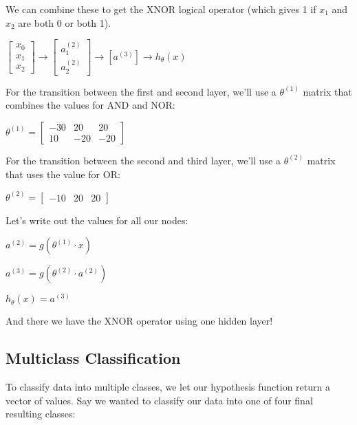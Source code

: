 \documentclass{article}
\begin{document}
We can combine these to get the XNOR logical operator (which gives 1 if $x_1$ and $x_2$ are both 0 or both 1).

$\begin{bmatrix}
x_0 \\
x_1 \\
x_2
\end{bmatrix}
\to
\begin{bmatrix}
a_1^{(2)} \\
a_2^{(2)}
\end{bmatrix}
\to
\left[a^{(3)} \right]
\to 
h_{\theta}(x)
$

For the transition between the first and second layer, we'll use a $\theta^{(1)}$ matrix that combines the values for AND and NOR:

$\theta^{(1)}=
\begin{bmatrix}
−30 & 20 & 20 \\
10  &−20 &−20
\end{bmatrix}
$

For the transition between the second and third layer, we'll use a $\theta^{(2)}$ matrix that uses the value for OR:

$\theta^{(2)}=\begin{bmatrix}−10 & 20 &20\end{bmatrix}$

Let's write out the values for all our nodes:

$a^{(2)}=g(\theta^{(1)}\cdot x)$

$a^{(3)}=g(\theta^{(2)} \cdot a^{(2)})$

$h_\theta(x)=a^{(3)}$

And there we have the XNOR operator using one hidden layer!
\subsection{Multiclass Classification}

To classify data into multiple classes, we let our hypothesis function return a vector of values. Say we wanted to classify our data into one of four final resulting classes:
\end{document}
